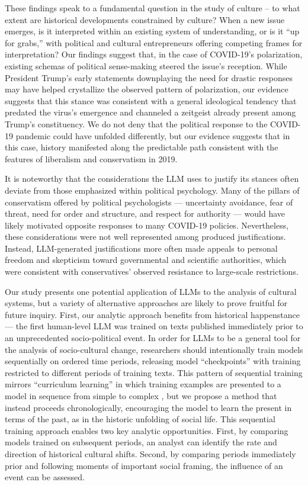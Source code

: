 \documentclass{article}
\begin{document}
These findings speak to a fundamental question in the study of culture
-- to what extent are historical developments constrained by culture?
When a new issue emerges, is it interpreted within an existing system of
understanding, or is it ``up for grabs,'' with political and cultural
entrepreneurs offering competing frames for interpretation? Our findings
suggest that, in the case of COVID-19's polarization, existing schemas
of political sense-making steered the issue's reception. While President
Trump's early statements downplaying the need for drastic responses may
have helped crystallize the observed pattern of polarization, our
evidence suggests that this stance was consistent with a general
ideological tendency that predated the virus's emergence and channeled a
zeitgeist already present among Trump's constituency. We do not deny
that the political response to the COVID-19 pandemic could have unfolded
differently, but our evidence suggests that in this case, history
manifested along the predictable path consistent with the features of
liberalism and conservatism in 2019.

It is noteworthy that the considerations the LLM uses to justify its
stances often deviate from those emphasized within political psychology.
Many of the pillars of conservatism offered by political psychologists
--- uncertainty avoidance, fear of threat, need for order and structure,
and respect for authority
\parencite{Jost2006-wm} --- would have
likely motivated opposite responses to many COVID-19 policies.
Nevertheless, these considerations were not well represented among
produced justifications. Instead, LLM-generated justifications more
often made appeals to personal freedom and skepticism toward
governmental and scientific authorities, which were consistent with
conservatives' observed resistance to large-scale restrictions.

Our study presents one potential application of LLMs to the analysis of
cultural systems, but a variety of alternative approaches are likely to
prove fruitful for future inquiry. First, our analytic approach benefits
from historical happenstance --- the first human-level LLM was trained
on texts published immediately prior to an unprecedented socio-political
event. In order for LLMs to be a general tool for the analysis of
socio-cultural change, researchers should intentionally train models
sequentially on ordered time periods, releasing model ``checkpoints''
with training restricted to different periods of training texts. This
pattern of sequential training mirrors ``curriculum learning'' in which
training examples are presented to a model in sequence from simple to
complex \parencite{Bengio2009-ig}, but we propose a method that instead proceeds chronologically,
encouraging the model to learn the present in terms of the past, as in
the historic unfolding of social life. This sequential training approach
enables two key analytic opportunities. First, by comparing models
trained on subsequent periods, an analyst can identify the rate and
direction of historical cultural shifts. Second, by comparing periods
immediately prior and following moments of important social framing, the
influence of an event can be assessed.
\end{document}
